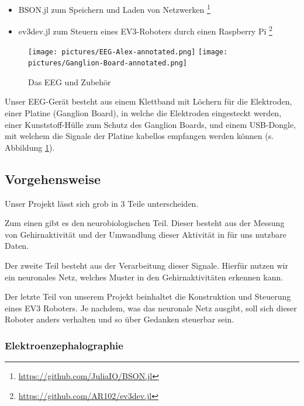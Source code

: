 \documentclass{scrartcl}
\begin{document}
\begin{itemize}
\begin{itemize}
			\item BSON.jl zum Speichern und Laden von Netzwerken
				\footnote{\href{https://github.com/JuliaIO/BSON.jl}{https://github.com/JuliaIO/BSON.jl}}
			
			\item ev3dev.jl zum Steuern eines EV3-Roboters durch einen Raspberry Pi
				\footnote{\href{https://github.com/AR102/ev3dev.jl}{https://github.com/AR102/ev3dev.jl}}
				\cite{ev3dev}
			
		\end{itemize}

	\end{itemize}

	\begin{figure}[h!]
		\texttt{[image: pictures/EEG-Alex-annotated.png]}
		\texttt{[image: pictures/Ganglion-Board-annotated.png]}
		\caption{Das EEG und Zubehör}
		\label{EEG-Zubehor}
	\end{figure}

	Unser EEG-Gerät besteht aus einem Klettband mit Löchern für die Elektroden, einer Platine (Ganglion Board), in welche die Elektroden eingesteckt werden, einer Kunststoff-Hülle zum Schutz des Ganglion Boards, und einem USB-Dongle, mit welchem die Signale der Platine kabellos empfangen werden können (s. Abbildung \ref{EEG-Zubehor}).

	\subsection{Vorgehensweise}

	Unser Projekt lässt sich grob in 3 Teile unterscheiden.

	Zum einen gibt es den neurobiologischen Teil. Dieser besteht aus der Messung von Gehirnaktivität und der Umwandlung dieser Aktivität in für uns nutzbare Daten.
	
	Der zweite Teil besteht aus der Verarbeitung dieser Signale. Hierfür nutzen wir ein neuronales Netz, welches Muster in den Gehirnaktivitäten erkennen kann.
	
	Der letzte Teil von unserem Projekt beinhaltet die Konstruktion und Steuerung eines EV3 Roboters. Je nachdem, was das neuronale Netz ausgibt, soll sich dieser Roboter anders verhalten und so über Gedanken steuerbar sein.	

	\subsubsection{Elektroenzephalographie}
\end{document}
